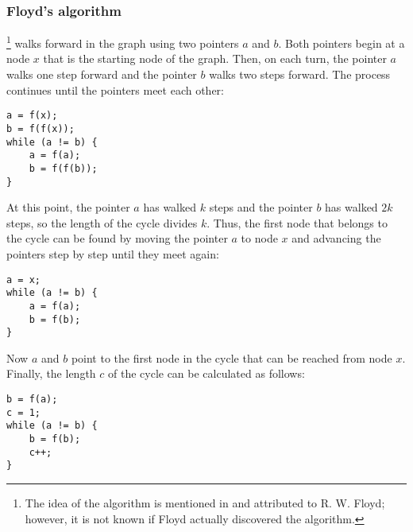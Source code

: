 \subsubsection{Floyd's algorithm}


\footnote{The idea of the algorithm is mentioned in \cite{knu982}
and attributed to R. W. Floyd; however, it is not known if Floyd actually
discovered the algorithm.} walks forward 
in the graph using two pointers $a$ and $b$.
Both pointers begin at a node $x$ that
is the starting node of the graph.
Then, on each turn, the pointer $a$ walks
one step forward and the pointer $b$
walks two steps forward.
The process continues until
the pointers meet each other:

\begin{lstlisting}
a = f(x);
b = f(f(x));
while (a != b) {
    a = f(a);
    b = f(f(b));
}
\end{lstlisting}

At this point, the pointer $a$ has walked $k$ steps
and the pointer $b$ has walked $2k$ steps,
so the length of the cycle divides $k$.
Thus, the first node that belongs to the cycle
can be found by moving the pointer $a$ to node $x$
and advancing the pointers
step by step until they meet again:

\begin{lstlisting}
a = x;
while (a != b) {
    a = f(a);
    b = f(b);
}
\end{lstlisting}

Now $a$ and $b$ point to the first node in the cycle
that can be reached from node $x$.
Finally, the length $c$ of the cycle
can be calculated as follows:

\begin{lstlisting}
b = f(a);
c = 1;
while (a != b) {
    b = f(b);
    c++;
}
\end{lstlisting}